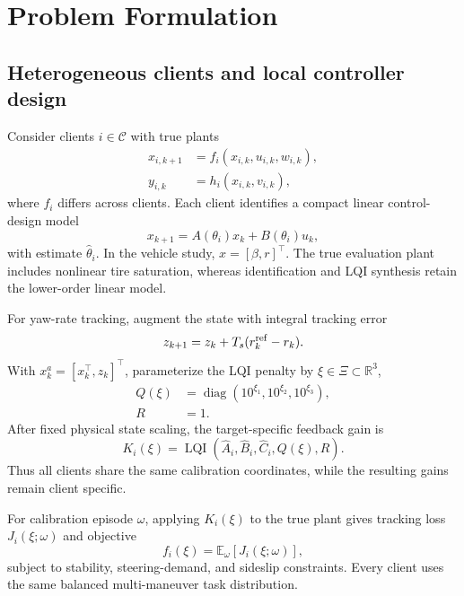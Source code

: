 \section{Problem Formulation}
\subsection{Heterogeneous clients and local controller design}
Consider clients $i\in\mathcal C$ with true plants
\begin{align}
 x_{i,k+1}&=f_i(x_{i,k},u_{i,k},w_{i,k}),\\
 y_{i,k}&=h_i(x_{i,k},v_{i,k}),
\end{align}
where $f_i$ differs across clients. Each client identifies a compact linear control-design model
\begin{equation}
 x_{k+1}=A(\theta_i)x_k+B(\theta_i)u_k,
 \label{eq:identified_model}
\end{equation}
with estimate $\hat\theta_i$. In the vehicle study, $x=[\beta,r]^\top$. The true evaluation plant includes nonlinear tire saturation, whereas identification and LQI synthesis retain the lower-order linear model.

For yaw-rate tracking, augment the state with integral tracking error
\begin{equation}
 z_{k+1}=z_k+T_s(r_k^{\rm ref}-r_k).
\end{equation}
With $x_k^a=[x_k^\top,z_k]^\top$, parameterize the LQI penalty by $\xi\in\Xi\subset\mathbb R^3$,
\begin{align}
 Q(\xi)&=\operatorname{diag}(10^{\xi_1},10^{\xi_2},10^{\xi_3}),\\
 R&=1.
 \label{eq:lqi_weights}
\end{align}
After fixed physical state scaling, the target-specific feedback gain is
\begin{equation}
 K_i(\xi)=\operatorname{LQI}(\hat A_i,\hat B_i,\hat C_i,Q(\xi),R).
 \label{eq:lqi_gain}
\end{equation}
Thus all clients share the same calibration coordinates, while the resulting gains remain client specific.

For calibration episode $\omega$, applying $K_i(\xi)$ to the true plant gives tracking loss $J_i(\xi;\omega)$ and objective
\begin{equation}
 f_i(\xi)=\mathbb E_{\omega}[J_i(\xi;\omega)],
 \label{eq:client_objective}
\end{equation}
subject to stability, steering-demand, and sideslip constraints. Every client uses the same balanced multi-maneuver task distribution.

